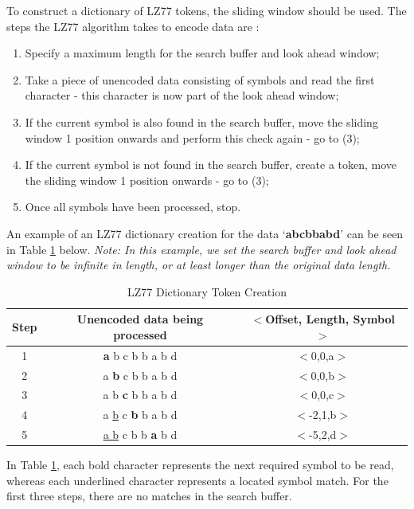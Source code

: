 \documentclass[12pt]{article}
\begin{document}
To construct a dictionary of LZ77 tokens, the sliding window should be used. The steps the LZ77 algorithm takes to encode data are \citep[p.~176-177]{dc_complete_ref}:

\begin{enumerate}
	\item Specify a maximum length for the search buffer and look ahead window;
	\item Take a piece of unencoded data consisting of symbols and read the first character - this character is now part of the look ahead window;
	\item If the current symbol is also found in the search buffer, move the sliding window 1 position onwards and perform this check again - go to (3);
	\item If the current symbol is not found in the search buffer, create a token, move the sliding window 1 position onwards - go to (3);
	\item Once all symbols have been processed, stop.
\end{enumerate} 
An example of an LZ77 dictionary creation for the data `\textbf{abcbbabd}' can be seen in Table \ref{dic_code_create} below. \emph{Note: In this example, we set the search buffer and look ahead window to be infinite in length, or at least longer than the original data length.}

\begin{table}[H]
	\centering
	\begin{tabular}{| c | c | c |} 
		\hline
		Step & Unencoded data being processed & $<$Offset, Length, Symbol$>$\\
		\hline
		1 & {\vrule width 0.5mm}\textbf{ a }b c b b a b d & $<$0,0,a$>$\\
		2 & a {\vrule width 0.5mm}\textbf{ b }c b b a b d & $<$0,0,b$>$\\
		3 & a b {\vrule width 0.5mm}\textbf{ c }b b a b d & $<$0,0,c$>$\\
		4 & a \underline{b} c {\vrule width 0.5mm}\textbf{ b }b a b d & $<$-2,1,b$>$\\
		5 & \underline{a b} c b b {\vrule width 0.5mm}\textbf{ a }b d & $<$-5,2,d$>$\\
		\hline
	\end{tabular}
	\caption{LZ77 Dictionary Token Creation}
	\label{dic_code_create}
\end{table}

In Table \ref{dic_code_create}, each bold character represents the next required symbol to be read, whereas each underlined character represents a located symbol match. For the first three steps, there are no matches in the search buffer. 
\end{document}
